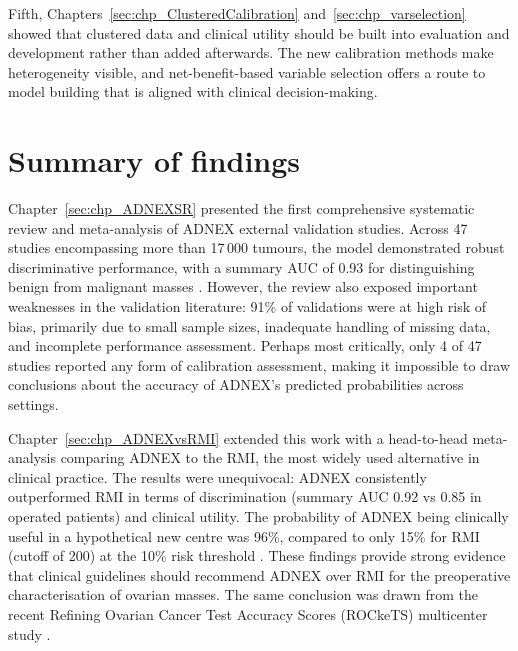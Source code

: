 Fifth, Chapters~\ref{sec:chp_ClusteredCalibration} and~\ref{sec:chp_varselection} showed that clustered data and clinical utility should be built into evaluation and development rather than added afterwards. The new calibration methods make heterogeneity visible, and net-benefit-based variable selection offers a route to model building that is aligned with clinical decision-making.

\section{Summary of findings}

Chapter~\ref{sec:chp_ADNEXSR} presented the first comprehensive systematic review and meta-analysis of \gls{ADNEX} external validation studies. Across 47 studies encompassing more than 17\,000 tumours, the model demonstrated robust discriminative performance, with a summary \gls{AUC} of 0.93 for distinguishing benign from malignant masses \cite{barrenadaADNEXRiskPrediction2024}. However, the review also exposed important weaknesses in the validation literature: 91\% of validations were at high risk of bias, primarily due to small sample sizes, inadequate handling of missing data, and incomplete performance assessment. Perhaps most critically, only 4 of 47 studies reported any form of calibration assessment, making it impossible to draw conclusions about the accuracy of \gls{ADNEX}'s predicted probabilities across settings.

Chapter~\ref{sec:chp_ADNEXvsRMI} extended this work with a head-to-head meta-analysis comparing \gls{ADNEX} to the \gls{RMI}, the most widely used alternative in clinical practice. The results were unequivocal: \gls{ADNEX} consistently outperformed \gls{RMI} in terms of discrimination (summary \gls{AUC} 0.92 vs 0.85 in operated patients) and clinical utility. The probability of \gls{ADNEX} being clinically useful in a hypothetical new centre was 96\%, compared to only 15\% for \gls{RMI} (cutoff of 200) at the 10\% risk threshold \cite{barrenadaHeadHeadComparison2025}. These findings provide strong evidence that clinical guidelines should recommend \gls{ADNEX} over \gls{RMI} for the preoperative characterisation of ovarian masses. The same conclusion was drawn from the recent Refining Ovarian Cancer Test Accuracy Scores (ROCkeTS) multicenter study \cite{sundarRiskpredictionModelsPostmenopausal2024,sundarDiagnosticTestsOvarian2026}.

